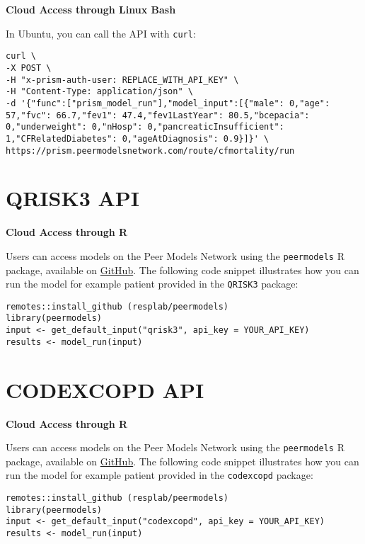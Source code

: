 \documentclass[
]{book}
\begin{document}
\textbf{Cloud Access through Linux Bash}

In Ubuntu, you can call the API with \texttt{curl}:

\begin{verbatim}
curl \
-X POST \
-H "x-prism-auth-user: REPLACE_WITH_API_KEY" \
-H "Content-Type: application/json" \
-d '{"func":["prism_model_run"],"model_input":[{"male": 0,"age": 57,"fvc": 66.7,"fev1": 47.4,"fev1LastYear": 80.5,"bcepacia": 0,"underweight": 0,"nHosp": 0,"pancreaticInsufficient": 1,"CFRelatedDiabetes": 0,"ageAtDiagnosis": 0.9}]}' \
https://prism.peermodelsnetwork.com/route/cfmortality/run
\end{verbatim}

\hypertarget{qrisk3-api}{%
\section{QRISK3 API}\label{qrisk3-api}}

\textbf{Cloud Access through R}

Users can access models on the Peer Models Network using the \texttt{peermodels} R package, available on \href{https://github.com/resplab/peermodels}{GitHub}. The following code snippet illustrates how you can run the model for example patient provided in the \texttt{QRISK3} package:

\begin{verbatim}
remotes::install_github (resplab/peermodels)
library(peermodels)
input <- get_default_input("qrisk3", api_key = YOUR_API_KEY)
results <- model_run(input)
\end{verbatim}

\hypertarget{codexcopd-api}{%
\section{CODEXCOPD API}\label{codexcopd-api}}

\textbf{Cloud Access through R}

Users can access models on the Peer Models Network using the \texttt{peermodels} R package, available on \href{https://github.com/resplab/peermodels}{GitHub}. The following code snippet illustrates how you can run the model for example patient provided in the \texttt{codexcopd} package:

\begin{verbatim}
remotes::install_github (resplab/peermodels)
library(peermodels)
input <- get_default_input("codexcopd", api_key = YOUR_API_KEY)
results <- model_run(input)
\end{verbatim}
\end{document}
